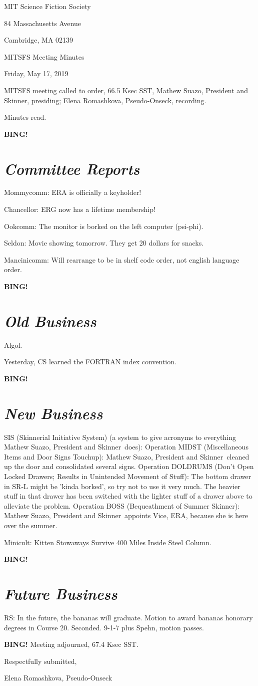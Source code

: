 \documentclass[10pt]{article}
\newcommand{\bing}{{\bf BING!} }
\newcommand{\goto}[1]{\bing \vskip 12pt \section*{{\em{#1}}}}
\newcommand{\ps}{ plus Spehn\xspace}
\newcommand{\skinner}{Mathew Suazo, President and Skinner}
\newcommand{\onseck}{Elena Romashkova, Pseudo-Onseck}
\newcommand{\meetingdate}{Friday, May 17, 2019}
\begin{document}
\begin{center}

MIT Science Fiction Society

84 Massachusetts Avenue

Cambridge, MA 02139

\vspace{12pt}

MITSFS Meeting Minutes

\meetingdate

\end{center}

\vspace{18pt}

\setlength{\parskip}{6pt}

\noindent
MITSFS meeting called to order, 66.5 Ksec SST,
\skinner, presiding; \onseck, recording.

Minutes read.

\goto{Committee Reports}
Mommycomm: ERA is officially a keyholder!

Chancellor: ERG now has a lifetime membership!

Ookcomm: The monitor is borked on the left computer (psi-phi).

Seldon: Movie showing tomorrow. They get 20 dollars for snacks.

Mancinicomm: Will rearrange to be in shelf code order, not english language order.

\goto{Old Business}

Algol.

Yesterday, CS learned the FORTRAN index convention.

\goto{New Business}

SIS (Skinnerial Initiative System) (a system to give acronyms to everything \skinner~does):
Operation MIDST (Miscellaneous Items and Door Signs Touchup): \skinner~cleaned up the door and consolidated several signs.
Operation DOLDRUMS (Don't Open Locked Drawers; Results in Unintended Movement of Stuff): The bottom drawer in SR-L might be 'kinda borked', so try not to use it very much. The heavier stuff in that drawer has been switched with the lighter stuff of a drawer above to alleviate the problem.
Operation BOSS (Bequeathment of Summer Skinner): \skinner~appoints Vice, ERA, because she is here over the summer.

Minicult: Kitten Stowaways Survive 400 Miles Inside Steel Column.

\goto{Future Business}

RS: In the future, the bananas will graduate. Motion to award bananas honorary degrees in Course 20. Seconded. 9-1-7 \ps, motion passes. 

\bing
\noindent
Meeting adjourned, 67.4 Ksec SST.

\vspace{18pt}

\centerline{Respectfully submitted,}
\centerline{\onseck}
\end{document}
